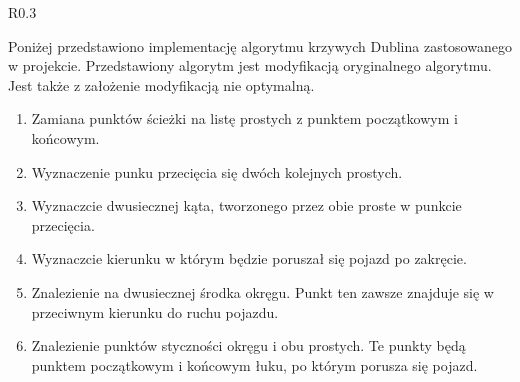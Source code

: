             \begin{wrapfigure}[3]{R}{0.3\textwidth}
                \centering
                \vspace{1cm}
            \end{wrapfigure}

            Poniżej przedstawiono implementację algorytmu krzywych Dublina zastosowanego w projekcie.
            Przedstawiony algorytm jest modyfikacją oryginalnego algorytmu.
            Jest także z założenie modyfikacją nie optymalną.

            \vspace{0.25cm}
            \begin{minipage}[l]{0.6\textwidth}
                \begin{enumerate}
                    \item Zamiana punktów ścieżki na listę prostych z punktem początkowym i końcowym.
                    \item Wyznaczenie punku przecięcia się dwóch kolejnych prostych.
                    \item Wyznaczcie dwusiecznej kąta, tworzonego przez obie proste w punkcie przecięcia.
                    \item Wyznaczcie kierunku w którym będzie poruszał się pojazd po zakręcie.
                    \item Znalezienie na dwusiecznej środka okręgu. Punkt ten zawsze znajduje się w przeciwnym kierunku do ruchu pojazdu.
                    \item Znalezienie punktów styczności okręgu i obu prostych. Te punkty będą punktem początkowym i końcowym łuku, po którym porusza się pojazd.
                \end{enumerate}
            \end{minipage}
            \vspace{0.25cm}

